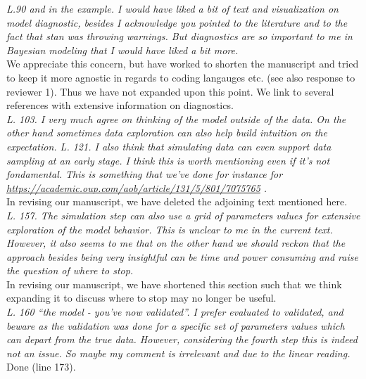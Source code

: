 \documentclass[11pt,a4paper]{article}
\begin{document}
\emph{L.90 and in the example. I would have liked a bit of text and visualization on model diagnostic, besides I acknowledge you pointed to the literature and to the fact that stan was throwing warnings. But diagnostics are so important to me in Bayesian modeling that I would have liked a bit more.}\\

We appreciate this concern, but have worked to shorten the manuscript and tried to keep it more agnostic in regards to coding langauges etc. (see also response to reviewer 1). Thus we have not expanded upon this point. We link to several references with extensive information on diagnostics.\\

\emph{L. 103. I very much agree on thinking of the model outside of the data. On the other hand sometimes data exploration can also help build intuition on the expectation. L. 121. I also think that simulating data can even support data sampling at an early stage. I think this is worth mentioning even if it's not fondamental. This is something
that we’ve done for instance for \url{https://academic.oup.com/aob/article/131/5/801/7075765} .}\\

In revising our manuscript, we have deleted the adjoining text mentioned here.\\

\emph{ L. 157. The simulation step can also use a grid of parameters values for extensive exploration of the model behavior. This is unclear to me in the current text. However, it also seems to me that on the other hand we should reckon that the approach besides being very insightful can be time and power consuming and raise the question of where to stop.}\\

In revising our manuscript, we have shortened this section such that we think expanding it to discuss where to stop may no longer be useful.\\

\emph{L. 160 “the model - you’ve now validated”. I prefer evaluated to validated, and beware as the validation was done for a specific set of parameters values which can depart from the true data. However, considering the fourth step this is indeed not an issue. So maybe my comment is irrelevant and due to the linear reading.}\\

Done (line 173). \\
\end{document}
